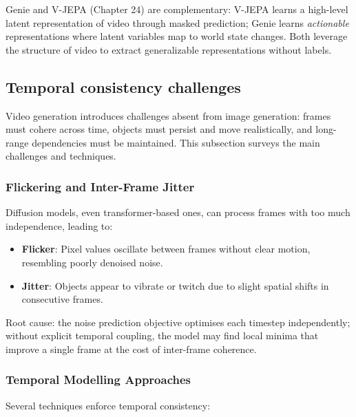 \begin{paperbox}[title={Relation to V-JEPA and Self-Supervised Video}]
Genie and V-JEPA (Chapter 24) are complementary: V-JEPA learns a high-level latent representation of video through masked prediction; Genie learns \emph{actionable} representations where latent variables map to world state changes. Both leverage the structure of video to extract generalizable representations without labels.
\end{paperbox}

\subsection{Temporal consistency challenges}

Video generation introduces challenges absent from image generation: frames must cohere across time, objects must persist and move realistically, and long-range dependencies must be maintained. This subsection surveys the main challenges and techniques.

\subsubsection{Flickering and Inter-Frame Jitter}

Diffusion models, even transformer-based ones, can process frames with too much independence, leading to:
\begin{itemize}
  \item \textbf{Flicker}: Pixel values oscillate between frames without clear motion, resembling poorly denoised noise.
  \item \textbf{Jitter}: Objects appear to vibrate or twitch due to slight spatial shifts in consecutive frames.
\end{itemize}

Root cause: the noise prediction objective optimises each timestep independently; without explicit temporal coupling, the model may find local minima that improve a single frame at the cost of inter-frame coherence.

\subsubsection{Temporal Modelling Approaches}

Several techniques enforce temporal consistency:

